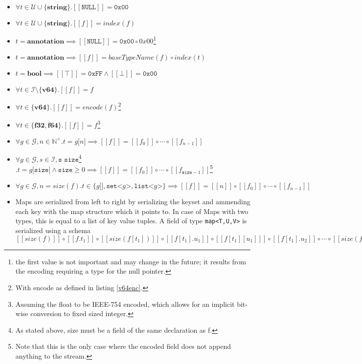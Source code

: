 \documentclass[a4paper,10pt]{article}
\newcommand{\den}[1]{[\![#1]\!]}
\begin{document}
\begin{itemize}
 \item $\forall t \in \mathcal{U}\cup\{\textbf{string}\}. \den{\texttt{NULL}} = \texttt{0x00}$
 \item $\forall t \in \mathcal{U}\cup\{\textbf{string}\}. \den{f} = index(f)$
 
 \item $t=\textbf{annotation} \implies \den{\texttt{NULL}} = \texttt{0x00} \circ 0x00$\footnote{the first value is not important and may change in the future; it results from the encoding requiring a type for the null pointer.}
 \item $t=\textbf{annotation} \implies \den{f} = baseTypeName(f) \circ index(t)$
 
 \item $t=\textbf{bool} \implies \den{\top} = \texttt{0xFF} \wedge \den{\bot} = \texttt{0x00}$
 
 \item $\forall t \in \mathcal{I}\setminus\{\textbf{v64}\}. \den{f} = f$
 
 \item $\forall t \in \{\textbf{v64}\}. \den{f} = encode(f)$\footnote{With encode as defined in listing \ref{v64enc}.}
 
 \item $\forall t \in \{\textbf{f32},\textbf{f64}\}. \den{f} = f$\footnote{Assuming the float to be IEEE-754 encoded, which allows for an implicit bit-wise conversion to fixed sized integer.}
 
 \item $\forall g \in \mathcal{G}, n \in \mathbb{N}^+. t = g\texttt{[}n\texttt{]} \implies \den{f} = \den{f_0} \circ \cdots \circ \den{f_{n-1}}$
 
 \item $\forall g \in \mathcal{G}, s \in \mathcal{I}, \texttt{s size}$\footnote{As stated above, size must be a field of the same declaration as f.} $. t = g\texttt{[size]} \wedge \texttt{size} \geq 0 \implies \den{f} = \den{f_0} \circ \cdots \circ \den{f_{\texttt{size}-1}}$\footnote{Note that this is the only case where the encoded field does not append anything to the stream.}
 
 \item $\forall g \in \mathcal{G}, n = size(f). t \in \{g\texttt{[]}, \texttt{set<}g\texttt{>}, \texttt{list<}g\texttt{>}\} \implies \den{f} = \den{n} \circ \den{f_0} \circ \cdots \circ \den{f_{n-1}}$
 
 \item Maps are serialized from left to right by serializing the keyset and ammending each key with the map structure which it points to. In case of Maps with two types, this is equal to a list of key value tuples.
 A field of type \verb/map<T,U,V>/ is serialized using a schema $ \den{size(f)} \circ \den{f.t_1} \circ \den{size(f[t_1])} \circ \den{f[t_1].u_1} \circ \den{f[t_1][u_1]} \circ \den{f[t_1].u_2} \circ \cdots \circ \den{size(f[t_2])} \circ \cdots \circ \den{f[t_n][u_m]}$
\end{itemize}
\end{document}
